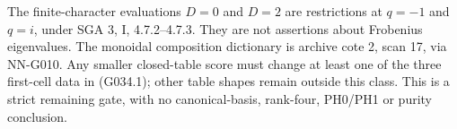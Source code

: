 The finite-character evaluations $D=0$ and $D=2$
are restrictions at $q=-1$ and $q=i$, under SGA 3,
I, 4.7.2--4.7.3. They are not assertions about Frobenius
eigenvalues. The monoidal composition dictionary is
archive cote 2, scan 17, via NN-G010.
Any smaller closed-table score must change at least one
of the three first-cell data in (G034.1); other table
shapes remain outside this class. This is a strict
remaining gate, with no canonical-basis, rank-four,
PH0/PH1 or purity conclusion.

